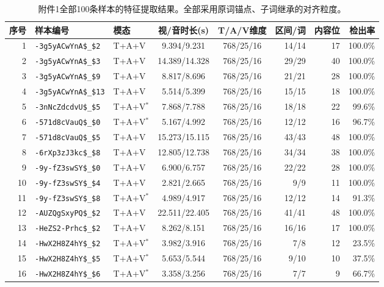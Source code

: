 \clearpage
\begin{table}[!ht]
\centering
\caption{附件1全部100条样本的特征提取结果。全部采用原词锚点、子词继承的对齐粒度。}
\label{q1:tab:all100}
\fontsize{8.5}{11}\selectfont
\setlength{\tabcolsep}{3pt}
\renewcommand{\arraystretch}{1.12}
\begin{tabular}{rllccrrr}
\toprule
序号 & 样本编号 & 模态 & 视/音时长(s) & T/A/V维度 & 区间/词 & 内容位 & 检出率 \\
\midrule
1 & \texttt{-3g5yACwYnA\$\_\$2} & T+A+V & 9.394/9.231 & 768/25/16 & 14/14 & 17 & 100.0\% \\
2 & \texttt{-3g5yACwYnA\$\_\$3} & T+A+V & 14.389/14.328 & 768/25/16 & 29/29 & 40 & 100.0\% \\
3 & \texttt{-3g5yACwYnA\$\_\$9} & T+A+V & 8.817/8.696 & 768/25/16 & 21/21 & 28 & 100.0\% \\
4 & \texttt{-3g5yACwYnA\$\_\$13} & T+A+V & 5.514/5.399 & 768/25/16 & 15/15 & 18 & 100.0\% \\
5 & \texttt{-3nNcZdcdvU\$\_\$5} & T+A+V$^{*}$ & 7.868/7.788 & 768/25/16 & 18/18 & 22 & 99.6\% \\
6 & \texttt{-571d8cVauQ\$\_\$0} & T+A+V$^{*}$ & 5.167/4.992 & 768/25/16 & 12/12 & 16 & 96.7\% \\
7 & \texttt{-571d8cVauQ\$\_\$5} & T+A+V & 15.273/15.115 & 768/25/16 & 43/43 & 48 & 100.0\% \\
8 & \texttt{-6rXp3zJ3kc\$\_\$8} & T+A+V & 12.805/12.738 & 768/25/16 & 34/34 & 38 & 100.0\% \\
9 & \texttt{-9y-fZ3swSY\$\_\$0} & T+A+V & 6.900/6.757 & 768/25/16 & 22/22 & 28 & 100.0\% \\
10 & \texttt{-9y-fZ3swSY\$\_\$4} & T+A+V & 2.821/2.665 & 768/25/16 & 9/9 & 11 & 100.0\% \\
11 & \texttt{-9y-fZ3swSY\$\_\$8} & T+A+V$^{*}$ & 4.989/4.917 & 768/25/16 & 12/12 & 14 & 91.3\% \\
12 & \texttt{-AUZQgSxyPQ\$\_\$2} & T+A+V & 22.511/22.405 & 768/25/16 & 41/41 & 48 & 100.0\% \\
13 & \texttt{-HeZS2-Prhc\$\_\$2} & T+A+V & 8.262/8.151 & 768/25/16 & 16/16 & 17 & 100.0\% \\
14 & \texttt{-HwX2H8Z4hY\$\_\$2} & T+A+V$^{*}$ & 3.982/3.916 & 768/25/16 & 7/8 & 12 & 23.5\% \\
15 & \texttt{-HwX2H8Z4hY\$\_\$5} & T+A+V$^{*}$ & 5.653/5.544 & 768/25/16 & 9/10 & 10 & 37.5\% \\
16 & \texttt{-HwX2H8Z4hY\$\_\$6} & T+A+V$^{*}$ & 3.358/3.256 & 768/25/16 & 7/7 & 9 & 66.7\% \\

\end{tabular}
\end{table}
